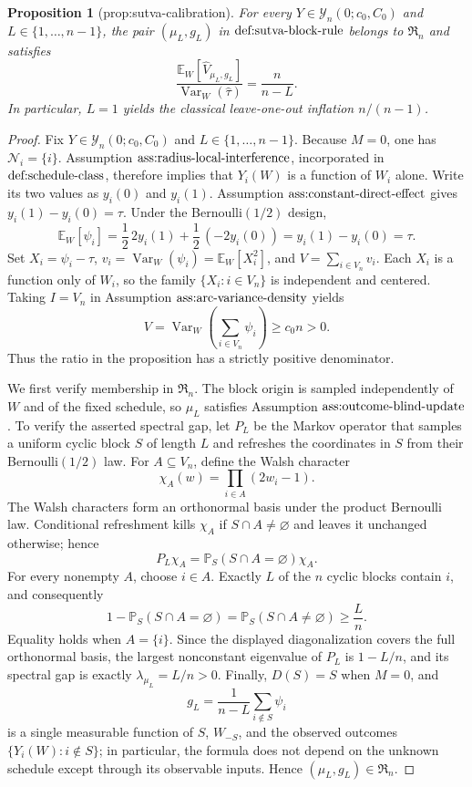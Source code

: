 \documentclass{article}
\newtheorem{proposition}{Proposition}
\begin{document}
\begin{proposition}[prop:sutva-calibration]\label{prop:sutva-calibration}
For every \(Y\in\mathcal Y_n(0;c_0,C_0)\) and \(L\in\{1,\ldots,n-1\}\), the pair \((\mu_L,g_L)\) in \(\textnormal{def:sutva-block-rule}\) belongs to \(\mathfrak R_n\) and satisfies \[\frac{\mathbb E_W[\widehat V_{\mu_L,g_L}]}{\operatorname{Var}_W(\widehat\tau)}=\frac{n}{n-L}.\] In particular, \(L=1\) yields the classical leave-one-out inflation \(n/(n-1)\).
\end{proposition}
\begin{proof}
Fix \(Y\in\mathcal Y_n(0;c_0,C_0)\) and \(L\in\{1,\ldots,n-1\}\). Because \(M=0\), one has \(\mathcal N_i=\{i\}\). Assumption \(\textnormal{ass:radius-local-interference}\), incorporated in \(\textnormal{def:schedule-class}\), therefore implies that \(Y_i(W)\) is a function of \(W_i\) alone. Write its two values as \(y_i(0)\) and \(y_i(1)\). Assumption \(\textnormal{ass:constant-direct-effect}\) gives \(y_i(1)-y_i(0)=\tau\). Under the Bernoulli\((1/2)\) design,
\[
\mathbb E_W[\psi_i]=\frac12\,2y_i(1)+\frac12\,(-2y_i(0))=y_i(1)-y_i(0)=\tau.
\]
Set \(X_i=\psi_i-\tau\), \(v_i=\operatorname{Var}_W(\psi_i)=\mathbb E_W[X_i^2]\), and \(V=\sum_{i\in V_n}v_i\). Each \(X_i\) is a function only of \(W_i\), so the family \(\{X_i:i\in V_n\}\) is independent and centered. Taking \(I=V_n\) in Assumption \(\textnormal{ass:arc-variance-density}\) yields
\[
V=\operatorname{Var}_W\!\left(\sum_{i\in V_n}\psi_i\right)\ge c_0n>0.
\]
Thus the ratio in the proposition has a strictly positive denominator.

We first verify membership in \(\mathfrak R_n\). The block origin is sampled independently of \(W\) and of the fixed schedule, so \(\mu_L\) satisfies Assumption \(\textnormal{ass:outcome-blind-update}\). To verify the asserted spectral gap, let \(P_L\) be the Markov operator that samples a uniform cyclic block \(S\) of length \(L\) and refreshes the coordinates in \(S\) from their Bernoulli\((1/2)\) law. For \(A\subseteq V_n\), define the Walsh character
\[
\chi_A(w)=\prod_{i\in A}(2w_i-1).
\]
The Walsh characters form an orthonormal basis under the product Bernoulli law. Conditional refreshment kills \(\chi_A\) if \(S\cap A\ne\varnothing\) and leaves it unchanged otherwise; hence
\[
P_L\chi_A=\mathbb P_S(S\cap A=\varnothing)\chi_A.
\]
For every nonempty \(A\), choose \(i\in A\). Exactly \(L\) of the \(n\) cyclic blocks contain \(i\), and consequently
\[
1-\mathbb P_S(S\cap A=\varnothing)=\mathbb P_S(S\cap A\ne\varnothing)\ge\frac Ln.
\]
Equality holds when \(A=\{i\}\). Since the displayed diagonalization covers the full orthonormal basis, the largest nonconstant eigenvalue of \(P_L\) is \(1-L/n\), and its spectral gap is exactly \(\lambda_{\mu_L}=L/n>0\). Finally, \(D(S)=S\) when \(M=0\), and
\[
g_L=\frac{1}{n-L}\sum_{i\notin S}\psi_i
\]
is a single measurable function of \(S\), \(W_{-S}\), and the observed outcomes \(\{Y_i(W):i\notin S\}\); in particular, the formula does not depend on the unknown schedule except through its observable inputs. Hence \((\mu_L,g_L)\in\mathfrak R_n\).


\end{proof}
\end{document}
